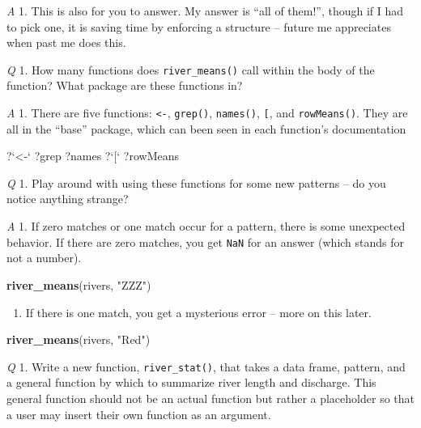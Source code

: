 \documentclass[
]{book}
\newenvironment{Shaded}{\begin{snugshade}}{\end{snugshade}}
\newcommand{\DataTypeTok}[1]{\textcolor[rgb]{0.13,0.29,0.53}{#1}}
\newcommand{\KeywordTok}[1]{\textcolor[rgb]{0.13,0.29,0.53}{\textbf{#1}}}
\newcommand{\NormalTok}[1]{#1}
\newcommand{\StringTok}[1]{\textcolor[rgb]{0.31,0.60,0.02}{#1}}
\providecommand{\tightlist}{%
  \setlength{\itemsep}{0pt}\setlength{\parskip}{0pt}}
\begin{document}
\emph{A} 1. This is also for you to answer. My answer is ``all of them!'', though if I had to pick one, it is saving time by enforcing a structure -- future me appreciates when past me does this.

\emph{Q} 1. How many functions does \texttt{river\_means()} call within the body of the function? What package are these functions in?

\emph{A} 1. There are five functions: \texttt{\textless{}-}, \texttt{grep()}, \texttt{names()}, \texttt{{[}}, and \texttt{rowMeans()}. They are all in the ``base'' package, which can been seen in each function's documentation

\begin{Shaded}
\begin{Highlighting}[]
\NormalTok{?}\StringTok{`}\DataTypeTok{<-}\StringTok{`}
\NormalTok{?grep}
\NormalTok{?names}
\NormalTok{?}\StringTok{`}\DataTypeTok{[}\StringTok{`}
\NormalTok{?rowMeans}
\end{Highlighting}
\end{Shaded}

\emph{Q} 1. Play around with using these functions for some new patterns -- do you notice anything strange?

\emph{A} 1. If zero matches or one match occur for a pattern, there is some unexpected behavior. If there are zero matches, you get \texttt{NaN} for an answer (which stands for not a number).

\begin{Shaded}
\begin{Highlighting}[]
\KeywordTok{river_means}\NormalTok{(rivers, }\StringTok{"ZZZ"}\NormalTok{)}
\end{Highlighting}
\end{Shaded}

\begin{enumerate}
\def\labelenumi{\arabic{enumi}.}
\setcounter{enumi}{1}
\tightlist
\item
  If there is one match, you get a mysterious error -- more on this later.
\end{enumerate}

\begin{Shaded}
\begin{Highlighting}[]
\KeywordTok{river_means}\NormalTok{(rivers, }\StringTok{"Red"}\NormalTok{)}
\end{Highlighting}
\end{Shaded}

\emph{Q} 1. Write a new function, \texttt{river\_stat()}, that takes a data frame, pattern, and a general function by which to summarize river length and discharge. This general function should not be an actual function but rather a placeholder so that a user may insert their own function as an argument.
\end{document}
